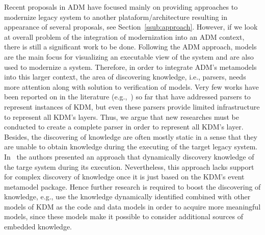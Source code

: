 Recent proposals in ADM have focused mainly on providing approaches to modernize legacy system to another plataform/architecture resulting in appearance of several proposals, see Section~\ref{ssub:approach}. However, if we look at overall problem of the integration of modernization into an ADM context, there is still a significant work to be done. Following the ADM approach, models are the main focus for visualizing an executable view of the system and are also used to modernize a system. Therefore, in order to integrate ADM's metamodels into this larger context, the area of discovering knowledge, i.e., parsers, needs more attention along with solution to verification of models. Very few works have been reported on in the literature (e.g.,~\cite{5440163,Bruneliere:2010:MGE:1858996.1859032}) so far that have addressed parsers to represent instances of KDM, but even these parsers provide limited infrastructure to represent all KDM's layers. Thus, we argue that new researches must be conducted to create a complete parser in order to represent all KDM's layer. Besides, the discovering of knowledge are often mostly static in a sense that they are unable to obtain knowledge during the executing of the target legacy system. In~\cite{5871783} the authors presented an approach that dynamically discovery knowledge of the targe system during its execution. Nevertheless, this approach lacks support for complex discovery of knowledge once it is just based on the KDM's event metamodel package. Hence further research is required to boost the discovering of knowledge, e.g., use the knowledge dynamically identified combined with other models of KDM as the code and data models in order to acquire more meaningful models, since these models make it possible to consider additional sources of embedded knowledge.

